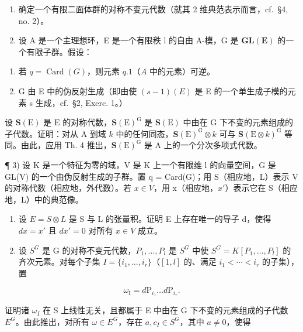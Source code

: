 
\begin{enumerate}
\def\labelenumi{\arabic{enumi})}
\item
  确定一个有限二面体群的对称不变元代数（就其 2 维典范表示而言，cf.~§4, no. 2）。
\item
  设 A 是一个主理想环，E 是一个有限秩 l 的自由 A-模，G 是 \(\mathbf{GL}(\mathbf{E})\) 的一个有限子群。假设：
\end{enumerate}

\begin{enumerate}
\def\labelenumi{(\roman{enumi})}
\item
  若 \(q = \operatorname{Card}(G)\)，则元素 \(q.1\)（\(A\) 中的元素）可逆。
\item
  G 由 E 中的伪反射生成（即由使 \((s - 1)(E)\) 是 E 的一个单生成子模的元素 s 生成，cf.~§2, Exerc. 1。）
\end{enumerate}

设 \(\mathbf{S}(\mathrm{E})\) 是 \(\mathrm{E}\) 的对称代数，\(\mathbf{S}(\mathrm{E})^{\mathrm{G}}\) 是 \(\mathbf{S}(\mathrm{E})\) 中由在 \(\mathrm{G}\) 下不变的元素组成的子代数。证明：对从 \(\mathrm{A}\) 到域 \(k\) 中的任何同态，\(\mathbf{S}(\mathrm{E})^{\mathrm{G}} \otimes k\) 可与 \(\mathbf{S}(\mathrm{E} \otimes k)^{\mathrm{G}}\) 等同。由此，应用 Th. 4 推出，\(\mathbf{S}(\mathrm{E})^{\mathrm{G}}\) 是 \(\mathrm{A}\) 上的一个分次多项式代数。

¶ 3) 设 K 是一个特征为零的域，V 是 K 上一个有限维 l 的向量空间，G 是 GL(V) 的一个由伪反射生成的子群。置 q = Card(G)；用 S（相应地，L）表示 V 的对称代数（相应地，外代数）。若 \(x \in V\)，用 x（相应地，\(x'\)）表示它在 S（相应地，L）中的典范像。

\begin{enumerate}
\def\labelenumi{\alph{enumi})}
\item
  设 \(E = S \otimes L\) 是 S 与 L 的张量积。证明 E 上存在唯一的导子 d，使得 \(dx = x'\) 且 \(dx' = 0\) 对所有 \(x \in V\) 成立。
\item
  设 \(S^{G}\) 是 G 的对称不变元代数，\(P_{1},\ldots,P_{l}\) 是 \(S^{G}\) 中使 \(S^{G}=K[P_{1},\ldots,P_{l}]\) 的齐次元素。对每个子集 \(I=\{i_{1},\ldots,i_{r}\}\)（\([1,l]\) 的、满足 \(i_{1}<\cdots<i_{r}\) 的子集），置
\end{enumerate}

\[
\omega_ {\mathrm{I}} = d \mathrm{P} _ {i _ {1}} \dots d \mathrm{P} _ {i _ {r}}.
\]

证明诸 \(\omega_{I}\) 在 S 上线性无关，且都属于 E 中由在 G 下不变的元素组成的子代数 \(E^{G}\)。由此推出，对所有 \(\omega \in E^{G}\)，存在 \(a, c_{I} \in S^{G}\)，其中 \(a \neq 0\)，使得

